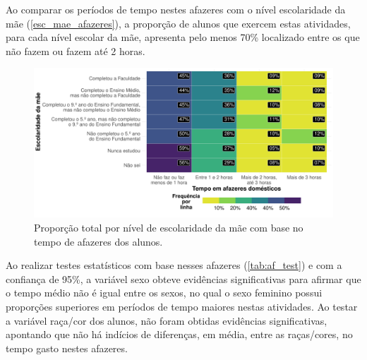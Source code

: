 \newpage
Ao comparar os períodos de tempo nestes afazeres com o nível escolaridade da mãe (\autoref{esc_mae_afazeres}), a proporção de alunos que exercem estas atividades, para
cada nível escolar da  mãe, apresenta pelo menos 70\% localizado entre os que 
não fazem ou fazem até 2 horas.

\begin{figure}[h]
    \caption{Proporção total por nível de escolaridade da mãe
    com base no tempo de afazeres dos alunos.\label{esc_mae_afazeres}}
    \begin{center}
        \includegraphics[width=16cm]{img/esc_mae_afazeres.pdf}
    \end{center}
\end{figure}


Ao realizar testes estatísticos com base nesses afazeres (\autoref{tab:af_test}) e com a
confiança de 95\%, a variável sexo obteve evidências significativas para afirmar que o tempo
médio não é igual entre os sexos, no qual o sexo feminino possui
proporções superiores em períodos de tempo maiores nestas atividades. Ao testar a variável
raça/cor dos alunos, não foram obtidas evidências significativas, apontando que não há indícios 
de diferenças, em média, entre as raças/cores, no tempo gasto nestes afazeres.
\clearpage


